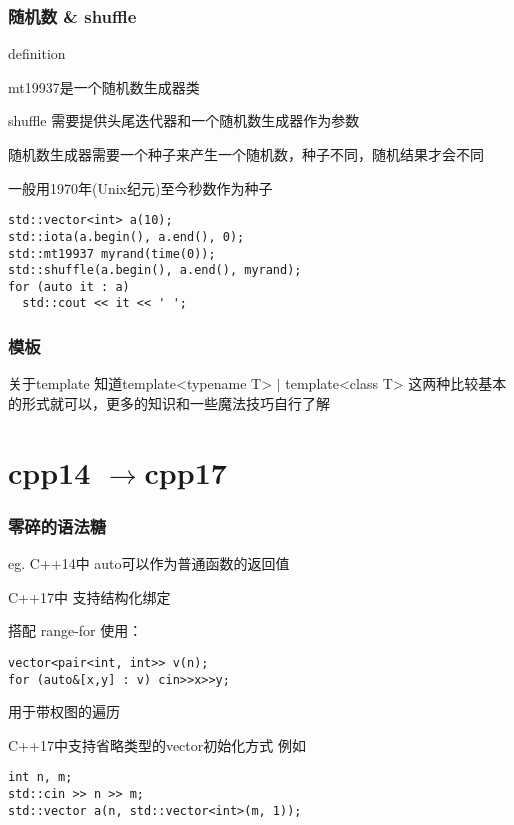 \documentclass{beamer}
\begin{document}
  \begin{frame}[fragile]
    \frametitle{随机数 \& shuffle}
    \begin{block}{definition}
  
      mt19937是一个随机数生成器类

      shuffle 需要提供头尾迭代器和一个随机数生成器作为参数

      随机数生成器需要一个种子来产生一个随机数，种子不同，随机结果才会不同

      一般用1970年(Unix纪元)至今秒数作为种子
      
      \begin{lstlisting}  
std::vector<int> a(10);
std::iota(a.begin(), a.end(), 0);
std::mt19937 myrand(time(0));
std::shuffle(a.begin(), a.end(), myrand);
for (auto it : a)
  std::cout << it << ' ';
      \end{lstlisting}
    \end{block}
  \end{frame}

  \begin{frame}
    \frametitle{模板}
      \begin{block}{关于template}
        知道template<typename T> $\mid$ template<class T>
        这两种比较基本的形式就可以，更多的知识和一些魔法技巧自行了解
      \end{block}
  \end{frame}

  \section{cpp14 \texorpdfstring{$\to$}\ cpp17}

  \begin{frame}[fragile]
    \frametitle{零碎的语法糖}
    \begin{block}{eg.}
      C++14中 auto可以作为普通函数的返回值
  
      C++17中 支持结构化绑定
  
      搭配 range-for 使用：
      \begin{lstlisting}
vector<pair<int, int>> v(n);
for (auto&[x,y] : v) cin>>x>>y;
      \end{lstlisting}

      用于带权图的遍历

      C++17中支持省略类型的vector初始化方式
      例如
      \begin{lstlisting}
int n, m;
std::cin >> n >> m;
std::vector a(n, std::vector<int>(m, 1));
      \end{lstlisting}
    \end{block}
  \end{frame}
\end{document}
